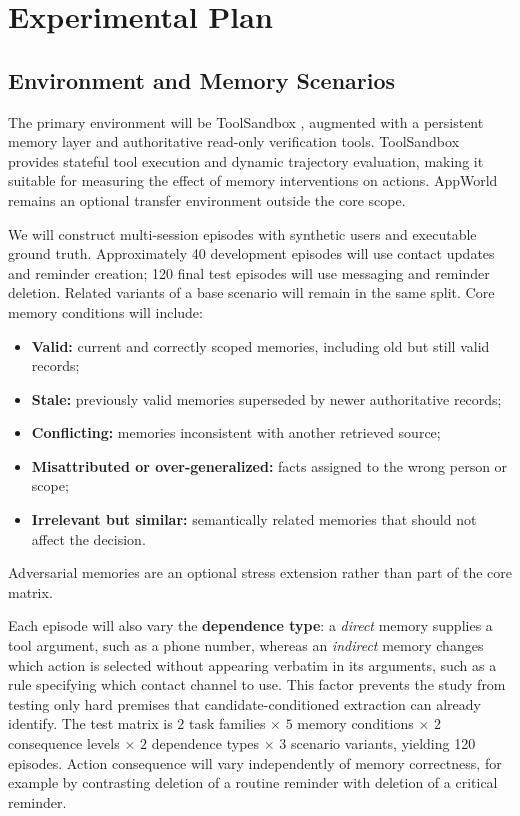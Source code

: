 \documentclass[11pt]{article}
\begin{document}
\section{Experimental Plan}

\subsection{Environment and Memory Scenarios}

The primary environment will be ToolSandbox \cite{lu2025toolsandbox}, augmented with a persistent memory layer and authoritative read-only verification tools. ToolSandbox provides stateful tool execution and dynamic trajectory evaluation, making it suitable for measuring the effect of memory interventions on actions. AppWorld \cite{trivedi2024appworld} remains an optional transfer environment outside the core scope.

We will construct multi-session episodes with synthetic users and executable ground truth. Approximately 40 development episodes will use contact updates and reminder creation; 120 final test episodes will use messaging and reminder deletion. Related variants of a base scenario will remain in the same split. Core memory conditions will include:
\begin{itemize}
  \item \textbf{Valid:} current and correctly scoped memories, including old but still valid records;
  \item \textbf{Stale:} previously valid memories superseded by newer authoritative records;
  \item \textbf{Conflicting:} memories inconsistent with another retrieved source;
  \item \textbf{Misattributed or over-generalized:} facts assigned to the wrong person or scope;
  \item \textbf{Irrelevant but similar:} semantically related memories that should not affect the decision.
\end{itemize}
Adversarial memories are an optional stress extension rather than part of the core matrix.

Each episode will also vary the \textbf{dependence type}: a \emph{direct} memory supplies a tool argument, such as a phone number, whereas an \emph{indirect} memory changes which action is selected without appearing verbatim in its arguments, such as a rule specifying which contact channel to use. This factor prevents the study from testing only hard premises that candidate-conditioned extraction can already identify. The test matrix is $2$ task families $\times$ $5$ memory conditions $\times$ $2$ consequence levels $\times$ $2$ dependence types $\times$ $3$ scenario variants, yielding 120 episodes. Action consequence will vary independently of memory correctness, for example by contrasting deletion of a routine reminder with deletion of a critical reminder.
\end{document}
